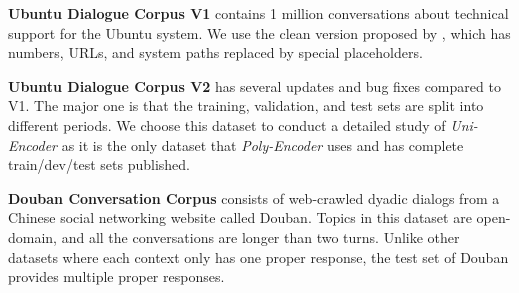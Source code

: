 \noindent\textbf{Ubuntu Dialogue Corpus V1} \citep{lowe2015ubuntu} contains 1 million conversations about technical support for the Ubuntu system. We use the clean version proposed by \citet{xu2017incorporating}, which has numbers, URLs, and system paths replaced by special placeholders.

\noindent\textbf{Ubuntu Dialogue Corpus V2} \citep{lowe2017training} has several updates and bug fixes compared to V1. The major one is that the training, validation, and test sets are split into different periods. We choose this dataset to conduct a detailed study of \textit{Uni-Encoder} as it is the only dataset that \textit{Poly-Encoder} \citep{humeau2019poly} uses and has complete train/dev/test sets published.

\noindent\textbf{Douban Conversation Corpus} \citep{wu2016sequential} consists of web-crawled dyadic dialogs from a Chinese social networking website called Douban. Topics in this dataset are open-domain, and all the conversations are longer than two turns. Unlike other datasets where each context only has one proper response, the test set of Douban provides multiple proper responses.



\begin{table}[t]
\centering
{}
\caption{Statistics of four benchmark datasets.}
\label{tab:dataset}
\end{table}










